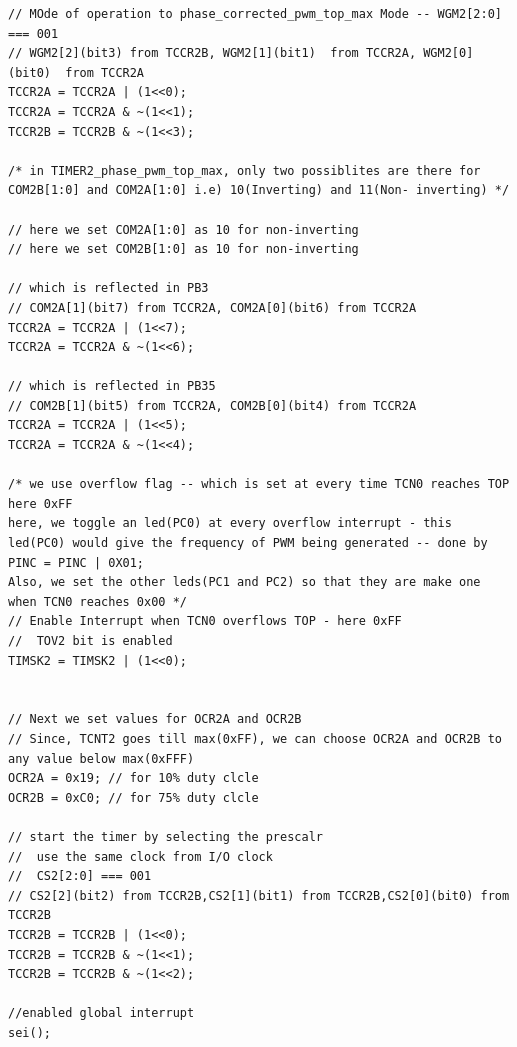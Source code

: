 \documentclass{article}
\begin{document}
\begin{verbatim}
// MOde of operation to phase_corrected_pwm_top_max Mode -- WGM2[2:0] === 001
// WGM2[2](bit3) from TCCR2B, WGM2[1](bit1)  from TCCR2A, WGM2[0](bit0)  from TCCR2A
TCCR2A = TCCR2A | (1<<0);
TCCR2A = TCCR2A & ~(1<<1);
TCCR2B = TCCR2B & ~(1<<3);	

/* in TIMER2_phase_pwm_top_max, only two possiblites are there for COM2B[1:0] and COM2A[1:0] i.e) 10(Inverting) and 11(Non- inverting) */

// here we set COM2A[1:0] as 10 for non-inverting
// here we set COM2B[1:0] as 10 for non-inverting

// which is reflected in PB3
// COM2A[1](bit7) from TCCR2A, COM2A[0](bit6) from TCCR2A
TCCR2A = TCCR2A | (1<<7);
TCCR2A = TCCR2A & ~(1<<6);

// which is reflected in PB35
// COM2B[1](bit5) from TCCR2A, COM2B[0](bit4) from TCCR2A
TCCR2A = TCCR2A | (1<<5);
TCCR2A = TCCR2A & ~(1<<4);

/* we use overflow flag -- which is set at every time TCN0 reaches TOP here 0xFF
here, we toggle an led(PC0) at every overflow interrupt - this led(PC0) would give the frequency of PWM being generated -- done by PINC = PINC | 0X01;
Also, we set the other leds(PC1 and PC2) so that they are make one when TCN0 reaches 0x00 */
// Enable Interrupt when TCN0 overflows TOP - here 0xFF
//  TOV2 bit is enabled
TIMSK2 = TIMSK2 | (1<<0);


// Next we set values for OCR2A and OCR2B
// Since, TCNT2 goes till max(0xFF), we can choose OCR2A and OCR2B to any value below max(0xFFF)
OCR2A = 0x19; // for 10% duty clcle
OCR2B = 0xC0; // for 75% duty clcle

// start the timer by selecting the prescalr
//  use the same clock from I/O clock
//  CS2[2:0] === 001
// CS2[2](bit2) from TCCR2B,CS2[1](bit1) from TCCR2B,CS2[0](bit0) from TCCR2B
TCCR2B = TCCR2B | (1<<0);
TCCR2B = TCCR2B & ~(1<<1);
TCCR2B = TCCR2B & ~(1<<2);

//enabled global interrupt
sei();
\end{verbatim}
\end{document}
